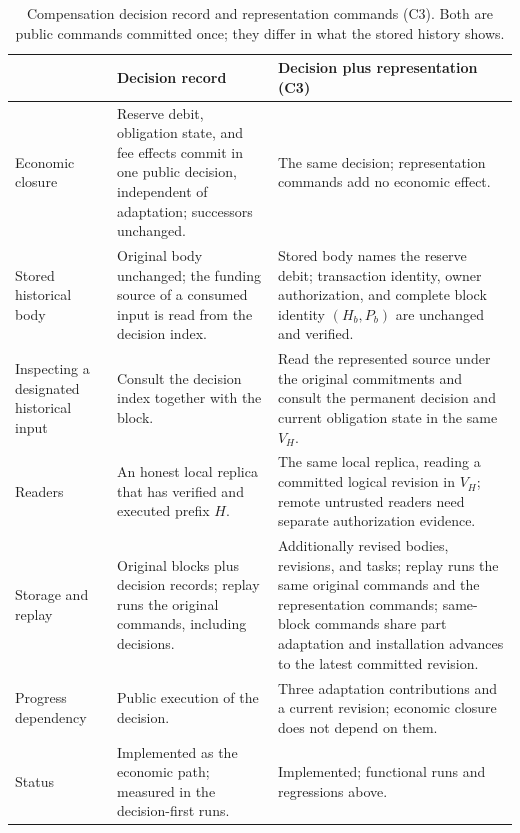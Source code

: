 \begin{table}[t]
  \caption{Compensation decision record and representation commands (C3).
    Both are public commands committed once; they differ in what the
    stored history shows.}
  \label{tab:c3-compare}
  \centering
  \small
  \begin{tabular}{@{}p{}p{}p{}@{}}
    \toprule
    & Decision record & Decision plus representation (C3) \\
    \midrule
    Economic closure
      & Reserve debit, obligation state, and fee effects commit in one
        public decision, independent of adaptation; successors unchanged.
      & The same decision; representation commands add no economic
        effect. \\
    Stored historical body
      & Original body unchanged; the funding source of a consumed input is
        read from the decision index.
      & Stored body names the reserve debit; transaction identity, owner
        authorization, and complete block identity $(H_b,P_b)$ are
        unchanged and verified. \\
    Inspecting a designated historical input
      & Consult the decision index together with the block.
      & Read the represented source under the original commitments and consult the permanent decision and current obligation state in the same $V_H$. \\
    Readers
      & An honest local replica that has verified and executed prefix $H$.
      & The same local replica, reading a committed logical revision in $V_H$; remote untrusted readers need separate authorization evidence. \\
    Storage and replay
      & Original blocks plus decision records; replay runs the original
        commands, including decisions.
      & Additionally revised bodies, revisions, and tasks; replay runs the
        same original commands and the representation commands;
        same-block commands share part adaptation and installation
        advances to the latest committed revision. \\
    Progress dependency
      & Public execution of the decision.
      & Three adaptation contributions and a current revision; economic
        closure does not depend on them. \\
    Status
      & Implemented as the economic path; measured in the decision-first
        runs.
      & Implemented; functional runs and regressions above. \\
    \bottomrule
  \end{tabular}
\end{table}

